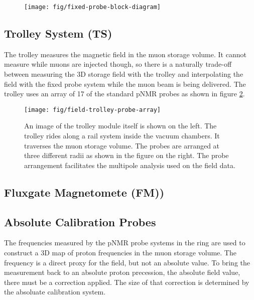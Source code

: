 \begin{figure}
\label{fig:fixed-probe-block-diagram}
\centering
\texttt{[image: fig/fixed-probe-block-diagram]}
\caption{}
\end{figure}

\subsection{Trolley System (TS)}

The trolley measures the magnetic field in the muon storage volume.  It cannot measure while muons are injected though, so there is a naturally trade-off between measuring the 3D storage field with the trolley and interpolating the field with the fixed probe system while the muon beam is being delivered.  The trolley uses an array of 17 of the standard pNMR probes as shown in figure \ref{fig:field-trolley-probe-array}.

\begin{figure}
\label{fig:field-trolley-probe-array}
\texttt{[image: fig/field-trolley-probe-array]}
\caption{An image of the trolley module itself is shown on the left.  The trolley rides along a rail system inside the vacuum chambers.  It traverses the muon storage volume.  The probes are arranged at three different radii as shown in the figure on the right.  The probe arrangement facilitates the multipole analysis used on the field data.}
\end{figure}

\subsection{Fluxgate Magnetomete (FM))}


\subsection{Absolute Calibration Probes}

The frequencies measured by the pNMR probe systems in the ring are used to construct a 3D map of proton frequencies in the muon storage volume.  The frequency is a direct proxy for the field, but not an absolute value.  To bring the measurement back to an absolute proton precession, the absolute field value, there must be a correction applied.  The size of that correction is determined by the absoluate calibration system.

